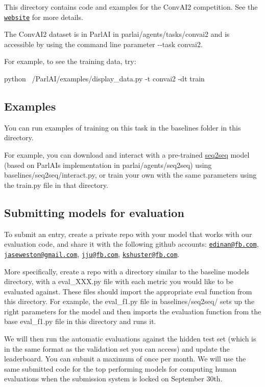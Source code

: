 This directory contains code and examples for the Conv\+A\+I2 competition. See the \href{http://convai.io/}{\tt website} for more details.

The Conv\+A\+I2 dataset is in Parl\+AI in parlai/agents/tasks/convai2 and is accessible by using the command line parameter {\ttfamily -\/-\/task convai2}.

For example, to see the training data, try\+: 
\begin{DoxyCode}
python ~/ParlAI/examples/display\_data.py -t convai2 -dt train
\end{DoxyCode}


\subsection*{Examples}

You can run examples of training on this task in the {\ttfamily baselines} folder in this directory.

For example, you can download and interact with a pre-\/trained \hyperlink{namespaceseq2seq}{seq2seq} model (based on Parl\+AI\textquotesingle{}s implementation in parlai/agents/seq2seq) using {\ttfamily baselines/seq2seq/interact.\+py}, or train your own with the same parameters using the {\ttfamily train.\+py} file in that directory.

\subsection*{Submitting models for evaluation}

To submit an entry, create a private repo with your model that works with our evaluation code, and share it with the following github accounts\+: \href{mailto:edinan@fb.com}{\tt edinan@fb.\+com}, \href{mailto:jaseweston@gmail.com}{\tt jaseweston@gmail.\+com}, \href{mailto:jju@fb.com}{\tt jju@fb.\+com}, \href{mailto:kshuster@fb.com}{\tt kshuster@fb.\+com}.

More specifically, create a repo with a directory similar to the baseline models directory, with a {\ttfamily eval\+\_\+\+X\+X\+X.\+py} file with each metric you would like to be evaluated against. These files should import the appropriate eval function from this directory. For example, the {\ttfamily eval\+\_\+f1.\+py} file in {\ttfamily baselines/seq2seq/} sets up the right parameters for the model and then imports the evaluation function from the base {\ttfamily eval\+\_\+f1.\+py} file in this directory and runs it.

We will then run the automatic evaluations against the hidden test set (which is in the same format as the validation set you can access) and update the leaderboard. You can submit a maximum of once per month. We will use the same submitted code for the top performing models for computing human evaluations when the submission system is locked on September 30th.

